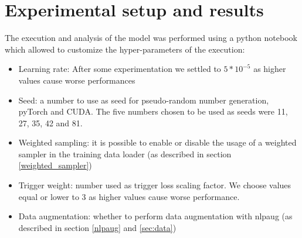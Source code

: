\documentclass[11pt,table,xcdraw]{article}
\begin{document}


\section{Experimental setup and results}
\label{sec:results}


The execution and analysis of the model was performed using a python notebook which allowed to customize the hyper-parameters of the execution:

\begin{itemize}
    \item Learning rate: After some experimentation we settled to $5*10^{-5}$ as higher values cause worse performances
    \item Seed: a number to use as seed for pseudo-random number generation, pyTorch and CUDA. The five numbers chosen to be used as seeds were 11, 27, 35, 42 and 81.
    \item Weighted sampling: it is possible to enable or disable the usage of a weighted sampler in the training data loader (as described in section \ref{weighted_sampler})
    \item Trigger weight: number used as trigger loss scaling factor. We choose values equal or lower to 3 as higher values cause worse performance.
    \item Data augmentation: whether to perform data augmentation with nlpaug (as described in section \ref{nlpaug} and \ref{sec:data})
\end{itemize}
\end{document}

